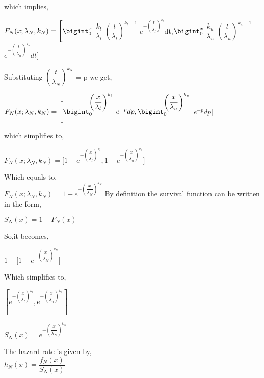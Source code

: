 \documentclass[12pt,a4paper,oneside]{article}
\begin{document}
which implies,
\begin{singlespace}
$F_{N}(x;{\lambda_{N}},k_{N})= \Biggl[\bigint_{0}^{x}$ $\dfrac{k_{l}}{{\lambda}_{l}}$ $\left(\dfrac{t}{\lambda_{l}}\right)^{k_{l}-1}$ $e^{-\left(\dfrac{t}{\lambda_{l}}\right)^{k_{l}}}$dt,$\bigint_{0}^{x}$ $\dfrac{k_{u}}{{\lambda}_{u}}$ $\left(\dfrac{t}{\lambda_{u}}\right)^{k_{u}-1}$ $e^{-\left(\dfrac{t}{\lambda_{u}}\right)^{k_{u}}}dt\Biggr]$
\end{singlespace}
Substituting $\left(\dfrac{t}{\lambda_{N}}\right)^{k_{N}}$ = p we get,
\begin{singlespace}
\hspace{5cm}$F_{N}(x;{\lambda_{N}},k_{N})= \Biggl[\bigint_{0}^{\left(\dfrac{x}{\lambda_{l}}\right)^{k_{l}}}$ $e^{-p}dp,\bigint_{0}^{\left(\dfrac{x}{\lambda_{u}}\right)^{k_{u}}}$ $e^{-p}dp\Biggr]$
\end{singlespace}\vspace{2cm}
which simplifies to,
\begin{singlespace}
\hspace{5cm}$F_{N}(x;{\lambda_{N}},k_{N})=\Biggl[1-e^{-\left(\dfrac{x}{\lambda_{l}}\right)^{k_{l}}},1-e^{-\left(\dfrac{x}{\lambda_{u}}\right)^{k_{u}}}\Biggr]$
\end{singlespace}
Which equals to,\\
\hspace*{5.5cm}$\boxed{F_{N}(x;{\lambda_{N}},k_{N})=1-e^{-\left(\dfrac{x}{\lambda_{N}}\right)^{k_{N}}}}$\newline\newline
By definition the survival function can be written in the form,\\
\begin{center}
$S_{N}(x)=1-F_{N}(x)$
\end{center}
So,it becomes,\\
\begin{center}
$1-\Biggl[1-e^{-\left(\dfrac{x}{\lambda_{N}}\right)^{k_{N}}}\Biggr]$
\end{center}
Which simplifies to,
\begin{center}
$\left[e^{-\left(\dfrac{x}{\lambda_{l}}\right)^{k_{l}}},e^{-\left(\dfrac{x}{\lambda_{u}}\right)^{k_{u}}}\right]$
\end{center}
\begin{center}
$\boxed{S_{N}(x)=e^{-\left(\dfrac{x}{\lambda_{N}}\right)^{k_{N}}}}$
\end{center}
\newpage
The hazard rate is given by,\\
\hspace*{5cm}$h_{N}(x)=\dfrac{f_{N}(x)}{S_{N}(x)}$\newline\newline\newline
\end{document}
